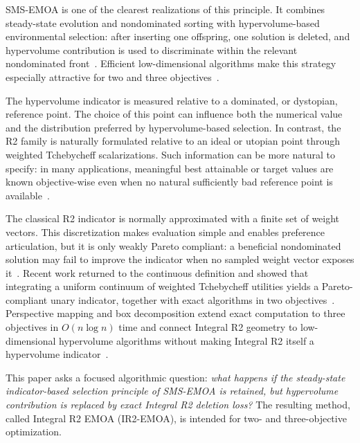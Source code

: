\documentclass[runningheads]{llncs}
\begin{document}
SMS-EMOA is one of the clearest realizations of this principle. It combines steady-state evolution and nondominated sorting with hypervolume-based environmental selection: after inserting one offspring, one solution is deleted, and hypervolume contribution is used to discriminate within the relevant nondominated front~\cite{BeumeNaujoksEmmerich2007}. Efficient low-dimensional algorithms make this strategy especially attractive for two and three objectives~\cite{EmmerichFonseca2011}.

The hypervolume indicator is measured relative to a dominated, or dystopian, reference point. The choice of this point can influence both the numerical value and the distribution preferred by hypervolume-based selection. In contrast, the R2 family is naturally formulated relative to an ideal or utopian point through weighted Tchebycheff scalarizations. Such information can be more natural to specify: in many applications, meaningful best attainable or target values are known objective-wise even when no natural sufficiently bad reference point is available~\cite{SchaepermeierKerschke2025,Emmerich2026Preference}.

The classical R2 indicator is normally approximated with a finite set of weight vectors. This discretization makes evaluation simple and enables preference articulation, but it is only weakly Pareto compliant: a beneficial nondominated solution may fail to improve the indicator when no sampled weight vector exposes it~\cite{BrockhoffWagnerTrautmann2012,TrautmannWagnerBrockhoff2013}. Recent work returned to the continuous definition and showed that integrating a uniform continuum of weighted Tchebycheff utilities yields a Pareto-compliant unary indicator, together with exact algorithms in two objectives~\cite{SchaepermeierKerschke2025,JaszkiewiczZielniewicz2025}. Perspective mapping and box decomposition extend exact computation to three objectives in $O(n\log n)$ time and connect Integral R2 geometry to low-dimensional hypervolume algorithms without making Integral R2 itself a hypervolume indicator~\cite{Emmerich2026Perspective}.

This paper asks a focused algorithmic question: \emph{what happens if the steady-state indicator-based selection principle of SMS-EMOA is retained, but hypervolume contribution is replaced by exact Integral R2 deletion loss?} The resulting method, called Integral R2 EMOA (IR2-EMOA), is intended for two- and three-objective optimization.
\end{document}
